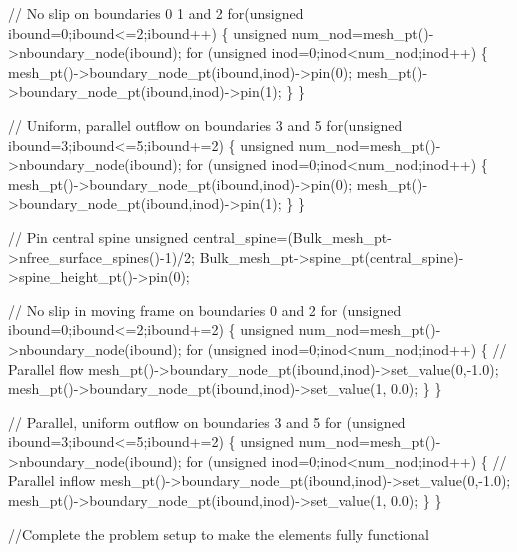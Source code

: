 \begin{DoxyCodeInclude}
 \textcolor{comment}{// No slip on boundaries 0 1 and 2}
 \textcolor{keywordflow}{for}(\textcolor{keywordtype}{unsigned} ibound=0;ibound<=2;ibound++)
  \{
   \textcolor{keywordtype}{unsigned} num\_nod=mesh\_pt()->nboundary\_node(ibound);
   \textcolor{keywordflow}{for} (\textcolor{keywordtype}{unsigned} inod=0;inod<num\_nod;inod++)
    \{
     mesh\_pt()->boundary\_node\_pt(ibound,inod)->pin(0);
     mesh\_pt()->boundary\_node\_pt(ibound,inod)->pin(1);
    \}
  \}

 \textcolor{comment}{// Uniform, parallel outflow on boundaries 3 and 5}
 \textcolor{keywordflow}{for}(\textcolor{keywordtype}{unsigned} ibound=3;ibound<=5;ibound+=2)
  \{
   \textcolor{keywordtype}{unsigned} num\_nod=mesh\_pt()->nboundary\_node(ibound);
   \textcolor{keywordflow}{for} (\textcolor{keywordtype}{unsigned} inod=0;inod<num\_nod;inod++)
    \{
     mesh\_pt()->boundary\_node\_pt(ibound,inod)->pin(0);
     mesh\_pt()->boundary\_node\_pt(ibound,inod)->pin(1);
    \}
  \}

 \textcolor{comment}{// Pin central spine}
 \textcolor{keywordtype}{unsigned} central\_spine=(Bulk\_mesh\_pt->nfree\_surface\_spines()-1)/2;
 Bulk\_mesh\_pt->spine\_pt(central\_spine)->spine\_height\_pt()->pin(0);


 \textcolor{comment}{// No slip in moving frame on boundaries 0 and 2}
 \textcolor{keywordflow}{for} (\textcolor{keywordtype}{unsigned} ibound=0;ibound<=2;ibound+=2)
  \{
   \textcolor{keywordtype}{unsigned} num\_nod=mesh\_pt()->nboundary\_node(ibound);
   \textcolor{keywordflow}{for} (\textcolor{keywordtype}{unsigned} inod=0;inod<num\_nod;inod++)
    \{
     \textcolor{comment}{// Parallel flow}
     mesh\_pt()->boundary\_node\_pt(ibound,inod)->set\_value(0,-1.0);
     mesh\_pt()->boundary\_node\_pt(ibound,inod)->set\_value(1, 0.0);
    \}
  \}
   

 \textcolor{comment}{// Parallel, uniform outflow on boundaries 3 and 5}
 \textcolor{keywordflow}{for} (\textcolor{keywordtype}{unsigned} ibound=3;ibound<=5;ibound+=2)
  \{
   \textcolor{keywordtype}{unsigned} num\_nod=mesh\_pt()->nboundary\_node(ibound);
   \textcolor{keywordflow}{for} (\textcolor{keywordtype}{unsigned} inod=0;inod<num\_nod;inod++)
    \{
     \textcolor{comment}{// Parallel inflow}
     mesh\_pt()->boundary\_node\_pt(ibound,inod)->set\_value(0,-1.0);
     mesh\_pt()->boundary\_node\_pt(ibound,inod)->set\_value(1, 0.0);
    \}
  \}
   


 \textcolor{comment}{//Complete the problem setup to make the elements fully functional}


\end{DoxyCodeInclude}
